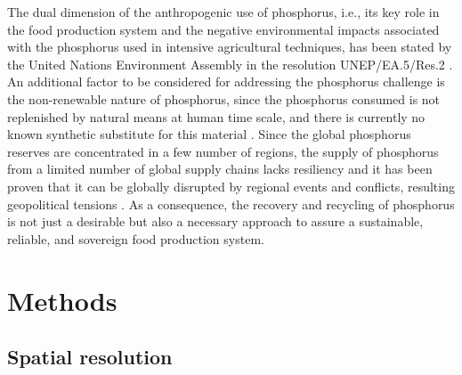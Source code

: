 \documentclass[authoryear]{elsarticle}
\begin{document}
The dual dimension of the anthropogenic use of phosphorus, i.e., its key role in the food production system and the negative environmental impacts associated with the phosphorus used in intensive agricultural techniques, has been stated by the United Nations Environment Assembly in the resolution UNEP/EA.5/Res.2 \citep{UN_Phosphorus}. An additional factor to be considered for addressing the phosphorus challenge is the non-renewable nature of phosphorus, since the phosphorus consumed is not replenished by natural means at human time scale, and there is currently no known synthetic substitute for this material \citep{cordell2009story}. Since the global phosphorus reserves are concentrated in a few number of regions, the supply of phosphorus from a limited number of global supply chains lacks resiliency and it has been proven that it can be globally disrupted by regional events and conflicts, resulting geopolitical tensions \citep{FAO_UkraineWar}. As a consequence, the recovery and recycling of phosphorus is not just a desirable but also a necessary approach to assure a sustainable, reliable, and sovereign food production system. 
\section{Methods}

%

\subsection{Spatial resolution}
\end{document}
